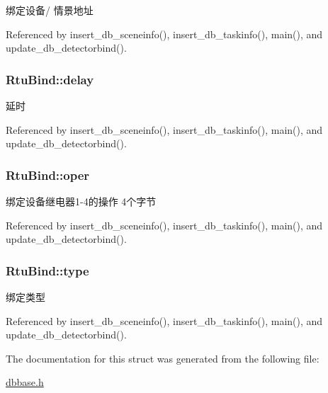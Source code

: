 绑定设备/ 情景地址 



Referenced by insert\-\_\-db\-\_\-sceneinfo(), insert\-\_\-db\-\_\-taskinfo(), main(), and update\-\_\-db\-\_\-detectorbind().

\hypertarget{structRtuBind_aa231213efdd49f97effe6b5dc9f4a243}{
\subsubsection[{delay}]{ Rtu\-Bind\-::delay}}\label{structRtuBind_aa231213efdd49f97effe6b5dc9f4a243}


延时 



Referenced by insert\-\_\-db\-\_\-sceneinfo(), insert\-\_\-db\-\_\-taskinfo(), main(), and update\-\_\-db\-\_\-detectorbind().

\hypertarget{structRtuBind_ac466a6951df3423d75ab25ce3accede3}{
\subsubsection[{oper}]{ Rtu\-Bind\-::oper}}\label{structRtuBind_ac466a6951df3423d75ab25ce3accede3}


绑定设备继电器1-\/4的操作 4个字节 



Referenced by insert\-\_\-db\-\_\-sceneinfo(), insert\-\_\-db\-\_\-taskinfo(), main(), and update\-\_\-db\-\_\-detectorbind().

\hypertarget{structRtuBind_ab9f60247ea34410bf323084c15435d65}{
\subsubsection[{type}]{ Rtu\-Bind\-::type}}\label{structRtuBind_ab9f60247ea34410bf323084c15435d65}


绑定类型 



Referenced by insert\-\_\-db\-\_\-sceneinfo(), insert\-\_\-db\-\_\-taskinfo(), main(), and update\-\_\-db\-\_\-detectorbind().



The documentation for this struct was generated from the following file\-:\begin{DoxyCompactItemize}
\item 
\hyperlink{dbbase_8h}{dbbase.\-h}\end{DoxyCompactItemize}
